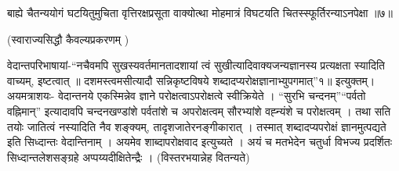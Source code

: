 {बाह्ये चैतन्ययोगं घटयितुमुचिता वृत्तिरक्षप्रसूता वाक्योत्था मोहमात्रं विघटयति चितस्स्फूर्तिरन्याऽनपेक्षा ॥७॥

(स्वाराज्यसिद्धौ कैवल्यप्रकरणम् )

वेदान्तपरिभाषायां-“नचैवमपि सुखस्यवर्तमानतादशायां त्वं सुखीत्यादिवाक्यजन्यज्ञानस्य प्रत्यक्षता स्यादिति वाच्यम्, इष्टत्वात् ॥ दशमस्त्वमसीत्यादौ सन्निकृष्टविषये शब्दादप्यरोक्षज्ञानाभ्युपगमात्”१॥ इत्युक्तम्। अयमत्राशयः- वेदान्तनये एकस्मिन्नेव ज्ञाने परोक्षत्वाऽपरोक्षत्वे स्वीक्रियेते । “सुरभि चन्दनम्”“पर्वतो वह्निमान्” इत्यादावपि चन्दनखण्डांशे पर्वतांशे च अपरोक्षत्वम्  सौरभ्यांशे वह्न्यंशे च परोक्षत्वम् । तथा सति तयोः जातित्वं नस्यादिति नैव शङ्क्यम्, तादृशजातेरनङ्गीकारात् । तस्मात् शब्दादप्यपरोक्षं ज्ञानमुत्पद्यते इति सिध्दान्तः वेदान्तिनाम् । अयमेव शाब्दापरोक्षवाद इत्युच्यते । अयं च मतभेदेन चतुर्धा विभज्य प्रदर्शितः सिध्दान्तलेशसङ्ग्रहे अप्पय्यदीक्षितेन्द्रैः । (विस्तरभयान्नेह वितन्यते)

\articleend
}
